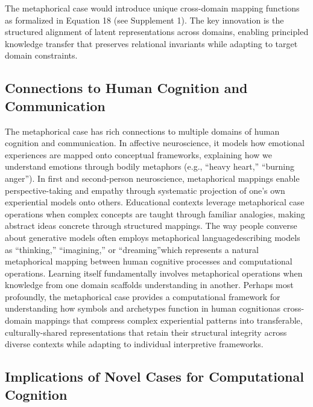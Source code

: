 \documentclass[
  11pt,
  letterpaper,
]{article}
\begin{document}
The metaphorical case would introduce unique cross-domain mapping
functions as formalized in Equation 18 (see Supplement 1). The key
innovation is the structured alignment of latent representations across
domains, enabling principled knowledge transfer that preserves
relational invariants while adapting to target domain constraints.

\hypertarget{connections-to-human-cognition-and-communication}{%
\subsection{Connections to Human Cognition and
Communication}\label{connections-to-human-cognition-and-communication}}

The metaphorical case has rich connections to multiple domains of human
cognition and communication. In affective neuroscience, it models how
emotional experiences are mapped onto conceptual frameworks, explaining
how we understand emotions through bodily metaphors (e.g., ``heavy
heart,'' ``burning anger''). In first and second-person neuroscience,
metaphorical mappings enable perspective-taking and empathy through
systematic projection of one's own experiential models onto others.
Educational contexts leverage metaphorical case operations when complex
concepts are taught through familiar analogies, making abstract ideas
concrete through structured mappings. The way people converse about
generative models often employs metaphorical languagedescribing models
as ``thinking,'' ``imagining,'' or ``dreaming''which represents a
natural metaphorical mapping between human cognitive processes and
computational operations. Learning itself fundamentally involves
metaphorical operations when knowledge from one domain scaffolds
understanding in another. Perhaps most profoundly, the metaphorical case
provides a computational framework for understanding how symbols and
archetypes function in human cognitionas cross-domain mappings that
compress complex experiential patterns into transferable,
culturally-shared representations that retain their structural integrity
across diverse contexts while adapting to individual interpretive
frameworks.

\hypertarget{implications-of-novel-cases-for-computational-cognition}{%
\subsection{Implications of Novel Cases for Computational
Cognition}\label{implications-of-novel-cases-for-computational-cognition}}
\end{document}
